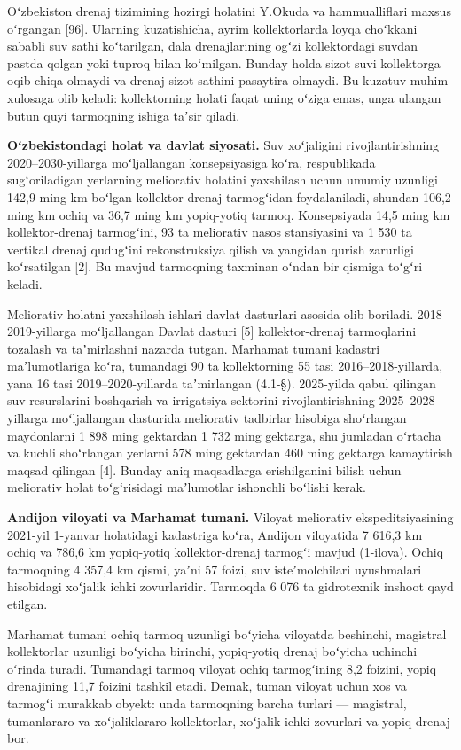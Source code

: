 \documentclass[14pt,a4paper,oneside]{extreport}
\begin{document}
Oʻzbekiston drenaj tizimining hozirgi holatini Y.Okuda va hammualliflari
maxsus oʻrgangan {[}96{]}. Ularning kuzatishicha, ayrim kollektorlarda
loyqa choʻkkani sababli suv sathi koʻtarilgan, dala drenajlarining ogʻzi
kollektordagi suvdan pastda qolgan yoki tuproq bilan koʻmilgan. Bunday
holda sizot suvi kollektorga oqib chiqa olmaydi va drenaj sizot sathini
pasaytira olmaydi. Bu kuzatuv muhim xulosaga olib keladi: kollektorning
holati faqat uning oʻziga emas, unga ulangan butun quyi tarmoqning
ishiga taʼsir qiladi.

\textbf{Oʻzbekistondagi holat va davlat siyosati.} Suv xoʻjaligini
rivojlantirishning 2020--2030-yillarga moʻljallangan konsepsiyasiga
koʻra, respublikada sugʻoriladigan yerlarning meliorativ holatini
yaxshilash uchun umumiy uzunligi 142,9 ming km boʻlgan kollektor-drenaj
tarmogʻidan foydalaniladi, shundan 106,2 ming km ochiq va 36,7 ming km
yopiq-yotiq tarmoq. Konsepsiyada 14,5 ming km kollektor-drenaj
tarmogʻini, 93 ta meliorativ nasos stansiyasini va 1 530 ta vertikal
drenaj qudugʻini rekonstruksiya qilish va yangidan qurish zarurligi
koʻrsatilgan {[}2{]}. Bu mavjud tarmoqning taxminan oʻndan bir qismiga
toʻgʻri keladi.

Meliorativ holatni yaxshilash ishlari davlat dasturlari asosida olib
boriladi. 2018--2019-yillarga moʻljallangan Davlat dasturi {[}5{]}
kollektor-drenaj tarmoqlarini tozalash va taʼmirlashni nazarda tutgan.
Marhamat tumani kadastri maʼlumotlariga koʻra, tumandagi 90 ta
kollektorning 55 tasi 2016--2018-yillarda, yana 16 tasi
2019--2020-yillarda taʼmirlangan (4.1-§). 2025-yilda qabul qilingan suv
resurslarini boshqarish va irrigatsiya sektorini rivojlantirishning
2025--2028-yillarga moʻljallangan dasturida meliorativ tadbirlar
hisobiga shoʻrlangan maydonlarni 1 898 ming gektardan 1 732 ming
gektarga, shu jumladan oʻrtacha va kuchli shoʻrlangan yerlarni 578 ming
gektardan 460 ming gektarga kamaytirish maqsad qilingan {[}4{]}. Bunday
aniq maqsadlarga erishilganini bilish uchun meliorativ holat
toʻgʻrisidagi maʼlumotlar ishonchli boʻlishi kerak.

\textbf{Andijon viloyati va Marhamat tumani.} Viloyat meliorativ
ekspeditsiyasining 2021-yil 1-yanvar holatidagi kadastriga koʻra,
Andijon viloyatida 7 616,3 km ochiq va 786,6 km yopiq-yotiq
kollektor-drenaj tarmogʻi mavjud (1-ilova). Ochiq tarmoqning 4 357,4 km
qismi, yaʼni 57 foizi, suv isteʼmolchilari uyushmalari hisobidagi
xoʻjalik ichki zovurlaridir. Tarmoqda 6 076 ta gidrotexnik inshoot qayd
etilgan.

Marhamat tumani ochiq tarmoq uzunligi boʻyicha viloyatda beshinchi,
magistral kollektorlar uzunligi boʻyicha birinchi, yopiq-yotiq drenaj
boʻyicha uchinchi oʻrinda turadi. Tumandagi tarmoq viloyat ochiq
tarmogʻining 8,2 foizini, yopiq drenajining 11,7 foizini tashkil etadi.
Demak, tuman viloyat uchun xos va tarmogʻi murakkab obyekt: unda
tarmoqning barcha turlari --- magistral, tumanlararo va xoʻjaliklararo
kollektorlar, xoʻjalik ichki zovurlari va yopiq drenaj bor.
\end{document}
